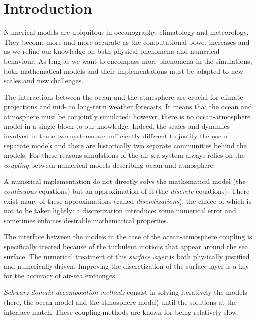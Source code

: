 
\chapter*{Introduction}
\label{ch:introduction}
Numerical models are ubiquitous in oceanography, climatology and
meteorology. They become more and more accurate as the
computational power increases and as we refine our knowledge on
both physical phenomena and numerical behaviour.
As long as we want to encompass more phenomena in the simulations,
both mathematical models and their implementations must be
adapted to new scales and new challenges.
\par %
The interactions between the ocean and the atmosphere are crucial
for climate projections and mid- to long-term weather forecasts.
It means that the ocean and atmosphere must be conjointly simulated;
however, there is no ocean-atmosphere model in a single
block to our knowledge.
Indeed, the scales and dynamics involved in those two systems are
sufficiently different to justify the use of separate models
and there are historically two separate communities behind the
models. For those reasons simulations of the air-sea system
always relies on the \textit{coupling} between numerical models describing
ocean and atmosphere.
\par %
A numerical implementation do not directly solve the mathematical
model (the \textit{continuous} equations) but an approximation of it
(the \textit{discrete} equations). There exist many of these
approximations (called \textit{discretizations}), the choice of which
is not to be taken lightly: a discretization introduces some
numerical error and sometimes enforces desirable mathematical
properties.
\par %
The interface between the models in the case of
the ocean-atmosphere coupling is specifically treated because
of the turbulent motions that appear around the sea surface.
The numerical treatment of this \textit{surface layer}
is both physically justified and numerically driven.
Improving the discretization of the surface
layer is a key for the accuracy of air-sea exchanges.
\par %
\textit{Schwarz domain decomposition methods} consist in solving
iteratively the models (here, the ocean model and the
atmosphere model) until the solutions at the interface match.
These coupling methods are known for being relatively slow.
